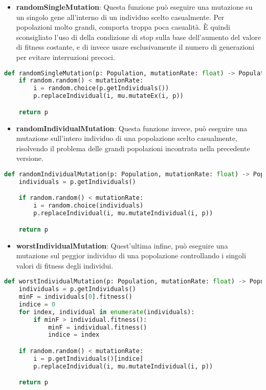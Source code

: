 \documentclass{article}
\begin{document}
\begin{itemize}
\item\textbf{randomSingleMutation}: Questa funzione può eseguire una mutazione su un singolo gene all'interno di un individuo scelto casualmente.
Per popolazioni molto grandi, comporta troppa poca casualità. È quindi sconsigliato l'uso di della condizione di stop sulla base dell'aumento del valore di fitness costante, e di invece usare esclusivamente il numero di generazioni per evitare interruzioni precoci.
\end{itemize}

\begin{lstlisting}[language=Python, breaklines, no caption]
def randomSingleMutation(p: Population, mutationRate: float) -> Population:
    if random.random() < mutationRate:
        i = random.choice(p.getIndividuals())
        p.replaceIndividual(i, mu.mutateEx(i, p))

    return p
\end{lstlisting}

\begin{itemize}
\item\textbf{randomIndividualMutation}: Questa funzione invece, può eseguire una mutazione sull'intero individuo di una popolazione scelto casualmente, risolvendo il problema delle grandi popolazioni incontrata nella precedente versione.
\end{itemize}

\begin{lstlisting}[language=Python, breaklines, no caption]
def randomIndividualMutation(p: Population, mutationRate: float) -> Population:
    individuals = p.getIndividuals()

    if random.random() < mutationRate:
        i = random.choice(individuals)
        p.replaceIndividual(i, mu.mutateIndividual(i, p))

    return p
\end{lstlisting}


\begin{itemize}
\item\textbf{worstIndividualMutation}: Quest'ultima infine, può eseguire una mutazione sul peggior individuo di una popolazione controllando i singoli valori di fitness degli individui.
\end{itemize}

\begin{lstlisting}[language=Python, breaklines, no caption]
def worstIndividualMutation(p: Population, mutationRate: float) -> Population:
    individuals = p.getIndividuals()
    minF = individuals[0].fitness()
    indice = 0
    for index, individual in enumerate(individuals):
        if minF > individual.fitness():
            minF = individual.fitness()
            indice = index

    if random.random() < mutationRate:
        i = p.getIndividuals()[indice]
        p.replaceIndividual(i, mu.mutateIndividual(i, p))

    return p
        \end{lstlisting}
\end{document}
